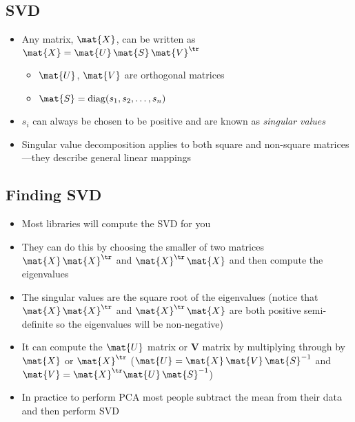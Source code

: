 \begin{slide}
\section{SVD}

\begin{PauseHighLight}
  \begin{itemize}
  \item Any matrix, $\mat{X}$, can be written as $\mat{X} =
    \mat{U}\,\mat{S}\,\mat{V}^\tr$
    \begin{itemize}
    \item $\mat{U}$, $\mat{V}$ are orthogonal matrices
    \item $\mat{S} = \mathrm{diag}(s_1, s_2,\ldots,s_n)$\pause
    \end{itemize}
  \item $s_i$ can always be chosen to be positive and are known as
    \emph{singular values}\pause
  \item Singular value decomposition applies to both square and
    non-square matrices---they describe general linear mappings\pause
  \end{itemize}
\end{PauseHighLight}

\end{slide}





\begin{slide}
\section{Finding SVD}

\begin{PauseHighLight}
  \begin{itemize}
  \item Most libraries will compute the SVD for you\pause
  \item They can do this by choosing the smaller of two matrices
    $\mat{X}\,\mat{X}^\tr$ and $\mat{X}^\tr\,\mat{X}$ and then compute
    the eigenvalues\pause
  \item The singular values are the square root of the eigenvalues
    (notice that $\mat{X}\,\mat{X}^\tr$ and $\mat{X}^\tr\,\mat{X}$ are
    both positive semi-definite so the eigenvalues will be
    non-negative)\pause
  \item It can compute the $\mat{U}$ matrix or $\bm{V}$ matrix by
    multiplying through by $\mat{X}$ or $\mat{X}^\tr$
    ($\mat{U} = \mat{X}\,\mat{V}\,\mat{S}^{-1}$ and $\mat{V} = \mat{X}^\tr
    \mat{U} \,\mat{S}^{-1}$)\pause 
  \item In practice to perform PCA most people subtract the mean from
    their data and then perform SVD\pause
  \end{itemize}
\end{PauseHighLight}

\end{slide}

